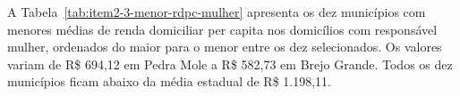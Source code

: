 A Tabela~\ref{tab:item2-3-menor-rdpc-mulher} apresenta os dez municípios com menores médias de renda domiciliar per capita nos domicílios com responsável mulher, ordenados do maior para o menor entre os dez selecionados. Os valores variam de R\$ 694,12 em Pedra Mole a R\$ 582,73 em Brejo Grande. Todos os dez municípios ficam abaixo da média estadual de R\$ 1.198,11.

